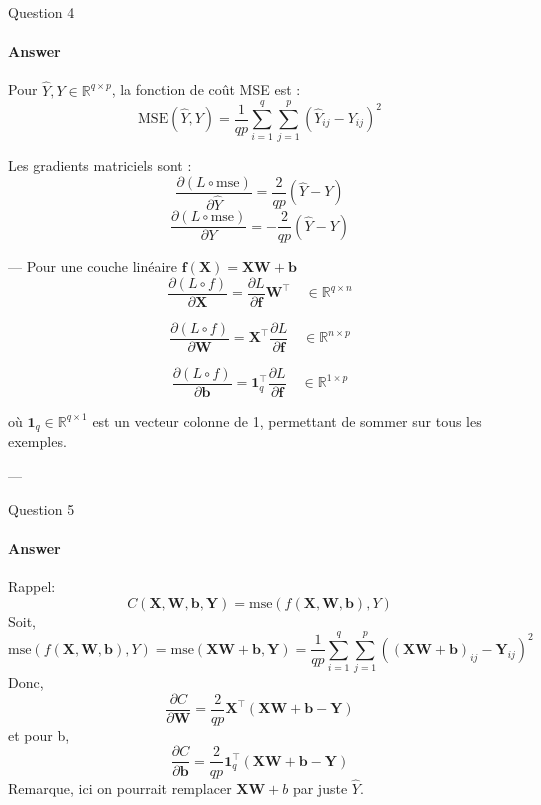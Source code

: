 \documentclass[12pt,a4paper]{article}
\begin{document}
\begin{section}{Question 4}

\paragraph{Answer}

Pour \(\hat{Y}, Y \in \mathbb{R}^{q \times p}\), la fonction de coût MSE est :  
\[
\text{MSE}(\hat{Y}, Y) = \frac{1}{qp} \sum_{i=1}^{q} \sum_{j=1}^{p} (\hat{Y}_{ij} - Y_{ij})^2
\]

Les gradients matriciels sont :  
\[
\frac{\partial (L \circ \text{mse})}{\partial \hat{Y}} = \frac{2}{qp} (\hat{Y} - Y) 
\]  
\[
\frac{\partial (L \circ \text{mse})}{\partial Y} = -\frac{2}{qp} (\hat{Y} - Y) 
\]

---
Pour une couche linéaire  
\(\mathbf{f}(\mathbf{X}) = \mathbf{X}\mathbf{W} + \mathbf{b}\)  
\[
\frac{\partial (L \circ f)}{\partial \mathbf{X}} = \frac{\partial L}{\partial \mathbf{f}} \mathbf{W}^\top \quad \in \mathbb{R}^{q \times n}
\]

\[
\frac{\partial (L \circ f)}{\partial \mathbf{W}} = \mathbf{X}^\top \frac{\partial L}{\partial \mathbf{f}} \quad \in \mathbb{R}^{n \times p}
\]

\[
\frac{\partial (L \circ f)}{\partial \mathbf{b}} = \mathbf{1}_q^\top \frac{\partial L}{\partial \mathbf{f}} \quad \in \mathbb{R}^{1 \times p}
\]

où \(\mathbf{1}_q \in \mathbb{R}^{q \times 1}\) est un vecteur colonne de 1, permettant de sommer sur tous les exemples.

---


\end{section}

\begin{section}{Question 5}

\paragraph{Answer}
Rappel: 
\[
C(\mathbf{X}, \mathbf{W}, \mathbf{b}, \mathbf{Y}) = \text{mse}(f(\mathbf{X}, \mathbf{W}, \mathbf{b}), Y)
\]
Soit,
\[
\text{mse}(f(\mathbf{X}, \mathbf{W}, \mathbf{b}), Y)
= \text{mse}(\mathbf{XW + b}, \mathbf{Y}) =
\frac{1}{qp} \sum_{i=1}^{q} \sum_{j=1}^{p} \left( (\mathbf{XW + b})_{ij} - \mathbf{Y}_{ij} \right)^2
\]
Donc,
\[
\frac{\partial C}{\partial \mathbf{W}} = \frac{2}{qp} \mathbf{X}^\top (\mathbf{XW + b - Y})
\]
et pour b,
\[
\frac{\partial C}{\partial \mathbf{b}} = \frac{2}{qp} \mathbf{1}_q^\top (\mathbf{XW + b - Y})
\]
Remarque, ici on pourrait remplacer $\mathbf{X}\mathbf{W} + b$ par juste $\hat{Y}$.

\end{section}
\end{document}
